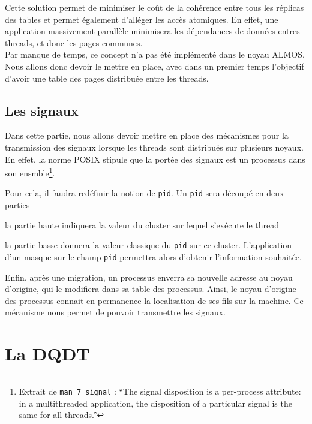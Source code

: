       Cette solution permet de minimiser le coût de la cohérence entre tous les
      réplicas des tables et permet également d'alléger les accès atomiques. En
      effet, une application massivement parallèle minimisera les dépendances de
      données entres threads, et donc les pages communes.\\

      Par manque de temps, ce concept n'a pas été implémenté dans le noyau
      ALMOS. Nous allons donc devoir le mettre en place, avec dans un premier
      temps l'objectif d'avoir une table des pages distribuée entre les
      threads.


    \subsection{Les signaux}

      Dans cette partie, nous allons devoir mettre en place des mécanismes pour
      la transmission des signaux lorsque les threads sont distribués sur
      plusieurs noyaux. En effet, la norme POSIX stipule que la portée des
      signaux est un processus dans son ensmble\footnote{Extrait de \texttt{man
          7 signal} : ``The signal disposition is a per-process attribute: in a
        multithreaded application, the disposition of a particular signal is the
        same for all threads.''}.

      Pour cela, il faudra redéfinir la notion de \texttt{pid}. Un \texttt{pid}
      sera découpé en deux parties \benumline \item la partie haute indiquera la
      valeur du cluster sur lequel s'exécute le thread \item la partie basse
      donnera la valeur classique du \texttt{pid} sur ce
      cluster\eenumline. L'application d'un masque sur le champ \texttt{pid}
      permettra alors d'obtenir l'information souhaitée.

      Enfin, après une migration, un processus enverra sa nouvelle adresse au
      noyau d'origine, qui le modifiera dans sa table des processus. Ainsi, le
      noyau d'origine des processus connait en permanence la localisation de ses
      fils sur la machine. Ce mécanisme nous permet de pouvoir transmettre les
      signaux.


  \section{La DQDT}
  \label{sec:dqdt}

